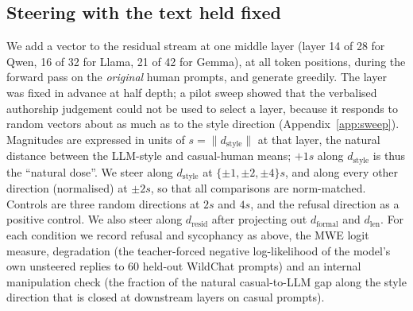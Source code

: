 \subsection{Steering with the text held fixed}
We add a vector to the residual stream at one middle layer (layer 14 of 28 for Qwen, 16 of 32 for Llama, 21 of 42 for Gemma), at all token positions, during the forward pass on the \emph{original} human prompts, and generate greedily. The layer was fixed in advance at half depth; a pilot sweep showed that the verbalised authorship judgement could not be used to select a layer, because it responds to random vectors about as much as to the style direction (Appendix~\ref{app:sweep}). Magnitudes are expressed in units of $s=\lVert d_{\text{style}}\rVert$ at that layer, the natural distance between the LLM-style and casual-human means; $+1s$ along $d_{\text{style}}$ is thus the ``natural dose''. We steer along $d_{\text{style}}$ at $\{\pm1,\pm2,\pm4\}s$, and along every other direction (normalised) at $\pm2s$, so that all comparisons are norm-matched. Controls are three random directions at $2s$ and $4s$, and the refusal direction as a positive control. We also steer along $d_{\text{resid}}$ after projecting out $d_{\text{formal}}$ and $d_{\text{len}}$. For each condition we record refusal and sycophancy as above, the MWE logit measure, degradation (the teacher-forced negative log-likelihood of the model's own unsteered replies to 60 held-out WildChat prompts) and an internal manipulation check (the fraction of the natural casual-to-LLM gap along the style direction that is closed at downstream layers on casual prompts).
